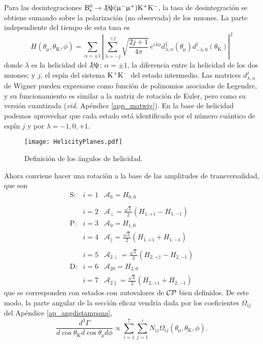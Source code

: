 Para las desintegraciones $\text{B}{}_{\text{s}}^{\text{0}} \rightarrow \text{J}\!/\!\uppsi (\upmu{}^{-} \upmu{}^{+}) \text{K}{}^{+}\text{K}{}^{-}$, la tasa de desintegración se obtiene sumando sobre la polarización (no observada) de los muones. La parte independiente del tiempo de esta tasa es \cite{zhang2013time}
\begin{equation}
	H_{} (\theta_{\upmu},\theta_{\text{K}},\phi) = \sum_{\alpha = \pm 1} \left|\sum_{\lambda = -j}^{+j} \sqrt{\frac{2j+1}{4\pi}}\, e^{i \lambda \phi} d_{\lambda,\alpha}^{1}(\theta_{\upmu})
	d_{-\lambda,0}^{j}(\theta_{\text{K}}) \right|^2
\end{equation}
%
donde $\lambda$ es la helicidad del $\text{J}\!/\!\uppsi$; $\alpha=\pm1$, la diferencia entre la helicidad de los dos muones; y $j$, el espín del sistema $\text{K}{}^{+}\text{K}{}^{-}$ del estado intermedio. 
%
Las matrices $d_{\lambda,\alpha}^{j}$ de Wigner pueden expresarse como función de polinomios asociados de Legendre, y su funcionamiento es similar a la matriz de rotación de Euler, pero como su versión cuantizada (\emph{vid.} Apéndice \ref{app_matwig}). En la base de helicidad podemos aprovechar que cada estado está identificado por el número cuántico de espín $j$ y por $\lambda = {-1,0,+1}$.

\begin{figure}[H]
\centering
\texttt{[image: HelicityPlanes.pdf]}
\caption{Definición de los ángulos de helicidad.} \label{fig_angdist}
\end{figure}


Ahora conviene hacer una rotación a la base de las amplitudes de transversalidad, que son
\begin{equation}
\begin{array}{ccl}
\text{S}:& i=1 & \mathcal{A}_{\text{S}} = H_{0,0} \\ \\
  & i=2 & \mathcal{A}_{\perp} = \frac{\sqrt{2}}{2} (H_{1,+1}-H_{1,-1})   \\
\text{P}:& i=3 & \mathcal{A}_{0} = H_{1,0} \\
  & i=4 & \mathcal{A}_{\parallel} = \frac{\sqrt{2}}{2} (H_{1,+1}+H_{1,-1}) \\ \\
  & i=5 & \mathcal{A}_{2\perp} = \frac{\sqrt{2}}{2} (H_{2,+1}-H_{2,-1}) \\
\text{D}:& i=6 & \mathcal{A}_{20} = H_{2,0} \\
  & i=7 & \mathcal{A}_{2\parallel} = \frac{\sqrt{2}}{2} (H_{2,+1}+H_{2,-1})  
\end{array}	\label{eq:amps}
\end{equation}
que se corresponden con estados con autovalores de $\mathcal{CP}$ bien definidos. De este modo, la parte angular de la sección eficaz vendría dada por los coeficientes $\Omega_{ij}$ del Apéndice \ref{ap_angdistampana},
\begin{equation}
\frac{d^3 \Gamma}{d\cos\theta_{\text{K}} d\cos\theta_{\upmu} d\phi} \propto \sum_{i=1}^{7}  \sum_{j=1}^i N_{ij} \Omega_{ij}(\theta_{\upmu},\theta_{\text{K}},\phi).
\end{equation}


